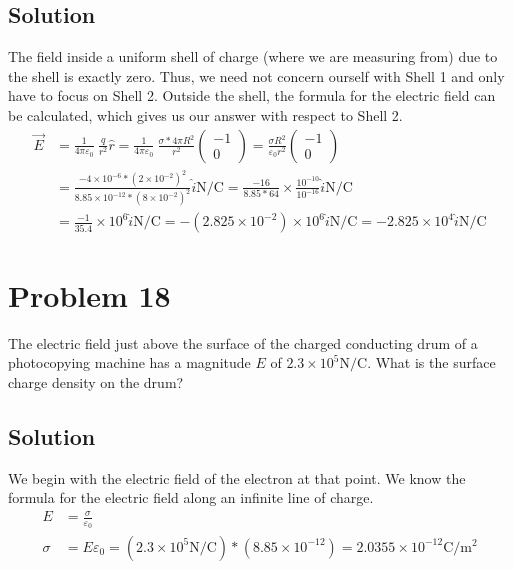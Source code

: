 \documentclass[12pt]{article}
\begin{document}
\subsection*{Solution}
The field inside a uniform shell of charge (where we are measuring from) due to the shell is exactly zero. Thus, we need not concern ourself with Shell 1 and only have to focus on Shell 2. Outside the shell, the formula for the electric field can be calculated, which gives us our answer with respect to Shell 2.
\begin{align*}
    \vec{E} &=  \frac{1}{4\pi\varepsilon_0}\ \frac{q}{r^2} \hat{r}
        =   \frac{1}{4\pi\varepsilon_0}\ \frac{\sigma*4\pi R^2}{r^2} \begin{pmatrix} -1 \\ 0 \end{pmatrix}
        =   \frac{\sigma R^2}{\varepsilon_0 r^2} \begin{pmatrix} -1 \\ 0 \end{pmatrix}\\
        &=  \frac{-4 \times 10^{-6} * (2 \times 10^{-2})^2}{8.85 \times 10^{-12} * (8 \times 10^{-2})^2}\hat{i} \unit{\newton/\coulomb}
        =   \frac{-16}{8.85 * 64} \times \frac{10^{-10}}{10^{-16}}\hat{i} \unit{\newton/\coulomb}\\
        &=  \frac{-1}{35.4} \times 10^{6}\hat{i} \unit{\newton/\coulomb}
        =   -(2.825 \times 10^{-2}) \times 10^{6}\hat{i} \unit{\newton/\coulomb}
        =   \boxed{-2.825 \times 10^4 \hat{i} \unit{\newton/\coulomb}}
\end{align*}

\pagebreak
\section{Problem 18}
The electric field just above the surface of the charged conducting drum of a photocopying machine has a magnitude $E$ of $2.3 \times 10^5 \unit{\newton/\coulomb}$. What is the surface charge density on the drum?

\subsection*{Solution}
We begin with the electric field of the electron at that point. We know the formula for the electric field along an infinite line of charge.
\begin{align*}
    E   &=  \frac{\sigma}{\varepsilon_0}\\
    \sigma  &=  E\varepsilon_0
        =   (2.3 \times 10^5 \unit{\newton/\coulomb})*(8.85 \times 10^{-12})
        =   \boxed{2.0355 \times 10^{-12} \unit{\coulomb/\meter^2}}
\end{align*}
\end{document}
